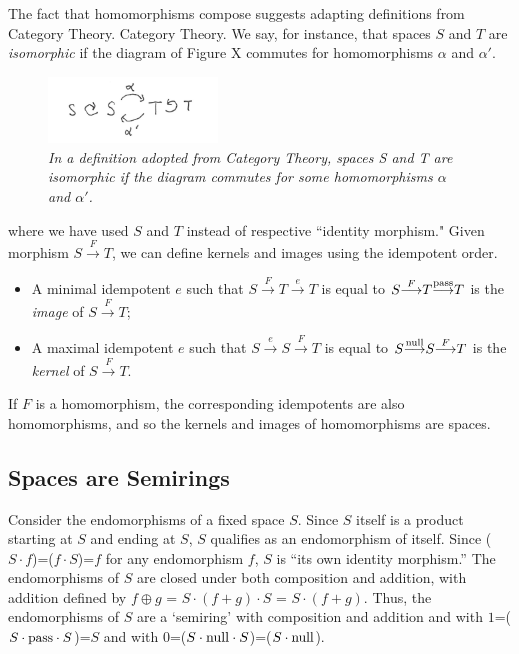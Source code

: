\documentclass[11pt]{article}
\begin{document}
The fact that homomorphisms compose suggests adapting definitions from Category Theory.  
Category Theory.  We say, for instance, that spaces $S$ and $T$ are {\it isomorphic} if the diagram of Figure X commutes for homomorphisms 
$\alpha$ and $\alpha'$.  
\begin{figure}[h]
\centering
\includegraphics[width=0.4\textwidth]{isomorphism.png}
\caption{{\it In a definition adopted from Category Theory, spaces S and T are isomorphic if the diagram commutes for some homomorphisms $\alpha$ and $\alpha'$.}}
\end{figure}
where we have used $S$ and $T$ instead of respective ``identity morphism."  Given morphism $S{\overset F\longrightarrow}T$, we can define kernels and images 
using the idempotent order.
\begin{itemize}
\item{A minimal idempotent $e$ such that $S{\overset F\longrightarrow}T{\overset e\longrightarrow}T$ is equal to $S{\overset F\longrightarrow}T{\overset {\rm pass}\longrightarrow}T$ is the {\it image} of $S{\overset F\longrightarrow}T$};
\item{A maximal idempotent $e$ such that $S{\overset e\longrightarrow}S{\overset F\longrightarrow}T$ is equal to  $S{\overset {\rm null}\longrightarrow}S{\overset F\longrightarrow}T$ is
the {\it kernel} of $S{\overset F\longrightarrow}T$}.
\end{itemize}
If $F$ is a homomorphism, the corresponding idempotents are also homomorphisms, and so the kernels and images of homomorphisms are spaces. 

\subsection{Spaces are Semirings} 

     Consider the endomorphisms of a fixed space $S$.  Since $S$ itself is a product starting at $S$ and ending at $S$, $S$ qualifies as an endomorphism of itself.  	
 Since ($S\cdot f$)=($f\cdot S$)=$f$ for any endomorphism $f$, $S$ is ``its own identity morphism.''  The endomorphisms 
of $S$ are closed under both composition and addition, with addition defined by $f\oplus g$ = $S\cdot(f+g)\cdot S$ = $S\cdot(f+g)$.  
Thus, the endomorphisms of $S$ are a `semiring' with composition and addition and with $1$=($S\cdot {\rm pass}\cdot S$)=$S$ and with 
$0$=($S\cdot {\rm null}\cdot S$)=($S\cdot {\rm null}$).  
\end{document}
